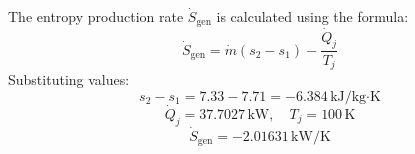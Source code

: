 The entropy production rate \( \dot{S}_{\text{gen}} \) is calculated using the formula:  
\[
\dot{S}_{\text{gen}} = \dot{m} (s_2 - s_1) - \frac{\dot{Q}_j}{T_j}
\]  
Substituting values:  
\[
s_2 - s_1 = 7.33 - 7.71 = -6.384 \, \text{kJ/kg·K}
\]  
\[
\dot{Q}_j = 37.7027 \, \text{kW}, \quad T_j = 100 \, \text{K}
\]  
\[
\dot{S}_{\text{gen}} = -2.01631 \, \text{kW/K}
\]